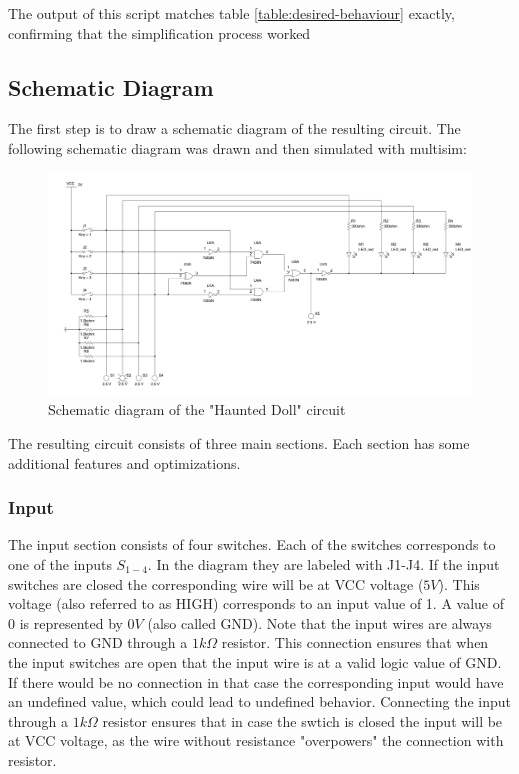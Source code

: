 \documentclass[14pt]{article}
\begin{document}
The output of this script matches table \ref{table:desired-behaviour} exactly, confirming that the simplification process worked

\subsection{Schematic Diagram}

The first step is to draw a schematic diagram of the resulting circuit. The following schematic diagram was drawn and then simulated with multisim:

\begin{figure}[H]
  \includegraphics[width=17cm]{./images/schematic.png}
  \caption{Schematic diagram of the "Haunted Doll" circuit}
  \label{fig:schematic}
\end{figure}

The resulting circuit consists of three main sections. Each section has some additional features and optimizations.

\subsubsection{Input}
The input section consists of four switches. Each of the switches corresponds to one of the inputs $S_{1-4}$. In the diagram they are labeled with J1-J4.
If the input switches are closed the corresponding wire will be at VCC voltage ($5V$). This voltage (also referred to as HIGH) corresponds to an input value
of 1. A value of 0 is represented by $0V$ (also called GND). Note that the input wires are always connected to GND through a $1k\Omega$ resistor. This connection ensures
that when the input switches are open that the input wire is at a valid logic value of GND. If there would be no connection in that case the corresponding
input would have an undefined value, which could lead to undefined behavior. Connecting the input through a $1k\Omega$ resistor ensures that in case the swtich
is closed the input will be at VCC voltage, as the wire without resistance "overpowers" the connection with resistor. \\
\end{document}
